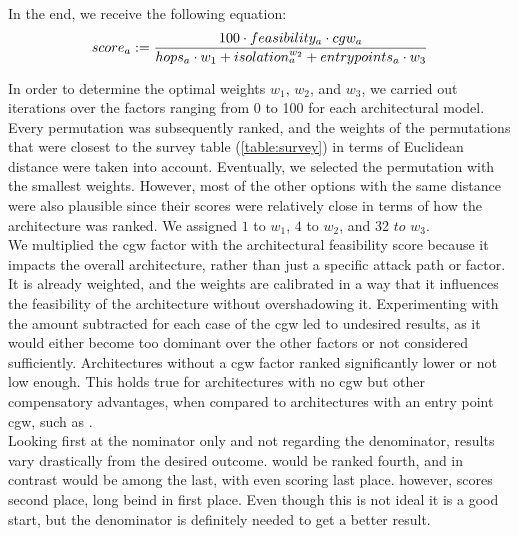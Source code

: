 In the end, we receive the following equation:\\
\begin{equation}
    score_{a} := \frac{100 \cdot  feasibility_{a} \cdot  cgw_{a}}{hops_{a} \cdot w_{1} + isolation_{a}^{w_{2}} + entrypoints_{a} \cdot w_{3}} \label{eq:rating}\\\\
\end{equation}

\hfill \break

In order to determine the optimal weights $w_{1}$, $w_{2}$, and $w_{3}$, we carried out iterations over the factors ranging from 0 to 100 for each architectural model. 
Every permutation was subsequently ranked, and the weights of the permutations that were closest to the survey table (\ref{table:survey}) in terms of Euclidean distance were taken into account. 
Eventually, we selected the permutation with the smallest weights. 
However, most of the other options with the same distance were also plausible since their scores were relatively close in terms of how the architecture was ranked. 
We assigned $1$ to $w_{1}$, $4$ to $w_{2}$, and 32 $to$ $w_{3}$.\\

We multiplied the \acrshort{cgw} factor with the architectural feasibility score because it impacts the overall architecture, 
rather than just a specific attack path or factor. 
It is already weighted, and the weights are calibrated in a way that it influences the feasibility of the architecture without overshadowing it. 
Experimenting with the amount subtracted for each case of the \acrshort{cgw} led to undesired results, 
as it would either become too dominant over the other factors or not considered sufficiently. 
Architectures without a \acrshort{cgw} factor ranked significantly lower or not low enough. 
This holds true for architectures with no \acrshort{cgw} but other compensatory advantages, 
when compared to architectures with an entry point \acrshort{cgw}, such as .\\

Looking first at the nominator only and not regarding the denominator, results vary drastically from the desired outcome.
 would be ranked fourth, and in contrast  would be among the last,
with  even scoring last place.
 however, scores second place, long beind  in first place.
Even though this is not ideal it is a good start, but the denominator is definitely needed to get a better result.\\

